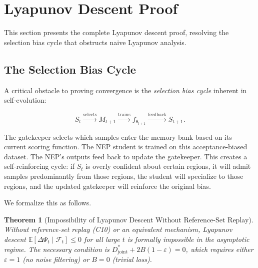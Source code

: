\documentclass[11pt,a4paper]{article}
\theoremstyle{plain}
\newtheorem{theorem}{Theorem}[section]
\theoremstyle{definition}
\theoremstyle{remark}
\newcommand{\E}{\mathbb{E}}
\newcommand{\F}{\mathcal{F}}
\begin{document}
\section{Lyapunov Descent Proof}\label{sec:lyapunov}

This section presents the complete Lyapunov descent proof, resolving the selection bias cycle that obstructs naive Lyapunov analysis.

\subsection{The Selection Bias Cycle}

A critical obstacle to proving convergence is the \emph{selection bias cycle} inherent in self-evolution:

\begin{equation}
    S_t \xrightarrow{\text{selects}} M_{t+1} \xrightarrow{\text{trains}} f_{\theta_{t+1}} \xrightarrow{\text{feedback}} S_{t+1}.
\end{equation}

The gatekeeper selects which samples enter the memory bank based on its current scoring function. The NEP student is trained on this acceptance-biased dataset. The NEP's outputs feed back to update the gatekeeper. This creates a self-reinforcing cycle: if $S_t$ is overly confident about certain regions, it will admit samples predominantly from those regions, the student will specialize to those regions, and the updated gatekeeper will reinforce the original bias.

We formalize this as follows.

\begin{theorem}[Impossibility of Lyapunov Descent Without Reference-Set Replay]\label{thm:impossible}
    Without reference-set replay (C10) or an equivalent mechanism, Lyapunov descent $\E[\Delta\Psi_t \mid \F_t] \leq 0$ for all large $t$ is \emph{formally impossible} in the asymptotic regime. The necessary condition is $D_{\text{joint}}^* + 2B(1-\varepsilon) = 0$, which requires either $\varepsilon = 1$ (no noise filtering) or $B = 0$ (trivial loss).
\end{theorem}
\end{document}
